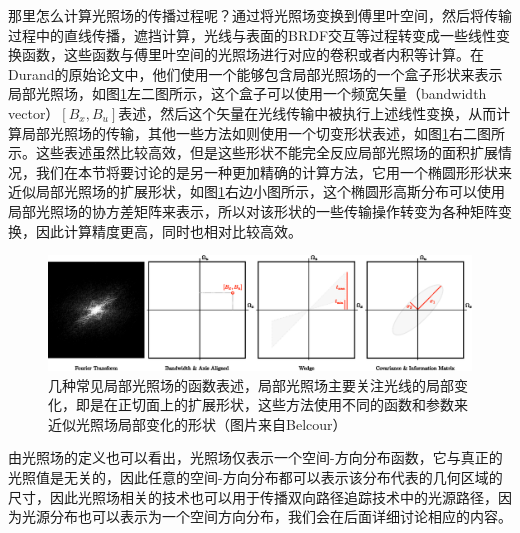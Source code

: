 那里怎么计算光照场的传播过程呢？\cite{a:AFrequencyAnalysisofLightTransport}通过将光照场变换到傅里叶空间，然后将传输过程中的直线传播，遮挡计算，光线与表面的BRDF交互等过程转变成一些线性变换函数，这些函数与傅里叶空间的光照场进行对应的卷积或者内积等计算。在Durand的原始论文中，他们使用一个能够包含局部光照场的一个盒子形状来表示局部光照场，如图\ref{f:pt-local-light-field-representation}左二图所示，这个盒子可以使用一个频宽矢量（bandwidth vector）$[B_x,B_u]$表述，然后这个矢量在光线传输中被执行上述线性变换，从而计算局部光照场的传输，其他一些方法如\cite{a:FrequencyAnalysisandShearedReconstructionforRenderingMotionBlur}则使用一个切变形状表述，如图\ref{f:pt-local-light-field-representation}右二图所示。这些表述虽然比较高效，但是这些形状不能完全反应局部光照场的面积扩展情况，我们在本节将要讨论的是另一种更加精确的计算方法，它用一个椭圆形形状来近似局部光照场的扩展形状，如图\ref{f:pt-local-light-field-representation}右边小图所示，这个椭圆形高斯分布可以使用局部光照场的协方差矩阵来表示，所以对该形状的一些传输操作转变为各种矩阵变换，因此计算精度更高，同时也相对比较高效。


\begin{figure}
\begin{fullwidth}
	\includegraphics[width=\thewidth]{figures/pt/local-light-representation}
	\caption{几种常见局部光照场的函数表述，局部光照场主要关注光线的局部变化，即是在正切面上的扩展形状，这些方法使用不同的函数和参数来近似光照场局部变化的形状（图片来自Belcour）}
	\label{f:pt-local-light-field-representation}
\end{fullwidth}
\end{figure}


由光照场的定义也可以看出，光照场仅表示一个空间-方向分布函数，它与真正的光照值是无关的，因此任意的空间-方向分布都可以表示该分布代表的几何区域的尺寸，因此光照场相关的技术也可以用于传播双向路径追踪技术中的光源路径，因为光源分布也可以表示为一个空间方向分布，我们会在后面详细讨论相应的内容。





